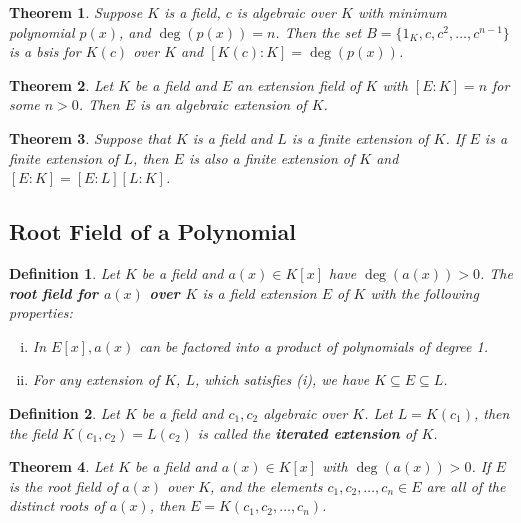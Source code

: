 \documentclass[letterpaper, 12pt]{article}
\newtheorem{defn}{Definition}
\newtheorem{thm}{Theorem}
\begin{document}
			\begin{thm}
			Suppose $K$ is a field, $c$ is algebraic over $K$ with minimum polynomial $p(x)$, and $\deg(p(x)) = n$.
			Then the set $B = \{ 1_{K}, c, c^{2}, \dots, c^{n-1} \}$ is a bsis for $K(c)$ over $K$ and $[K(c):K]=\deg(p(x))$.
			\end{thm}

			\begin{thm}
			Let $K$ be a field and $E$ an extension field of $K$ with $[E:K] = n$ for some $n>0$.
			Then $E$ is an algebraic extension of $K$.
			\end{thm}

			\begin{thm}
			Suppose that $K$ is a field and $L$ is a finite extension of $K$.
			If $E$ is a finite extension of $L$, then $E$ is also a finite extension of $K$ and $[E:K] = [E:L][L:K]$.
			\end{thm}

		\subsection{Root Field of a Polynomial}
		\label{sec:root_field_of_a_polynomial}
			\setcounter{defn}{22}
			\begin{defn}
			Let $K$ be a field and $a(x) \in K[x]$ have $\deg(a(x)) > 0$.
			The \textbf{root field for $a(x)$ over $K$} is a field extension $E$ of $K$ with the following properties:
				\begin{enumerate}[(i)]
				\item In $E[x], a(x)$ can be factored into a product of polynomials of degree 1.
				\item For any extension of $K$, $L$, which satisfies (i), we have $K \subseteq E \subseteq L$.
				\end{enumerate}
			\end{defn}

			\setcounter{defn}{24}
			\begin{defn}
			Let $K$ be a field and $c_{1}, c_{2}$ algebraic over $K$.
			Let $L = K(c_{1})$, then the field $K(c_{1},c_{2}) = L(c_{2})$ is called the \textbf{iterated extension} of $K$.
			\end{defn}

			\setcounter{thm}{25}
			\begin{thm}
			Let $K$ be a field and $a(x) \in K[x]$ with $\deg(a(x)) > 0$.
			If $E$ is the root field of $a(x)$ over $K$, and the elements $c_{1}, c_{2}, \dots, c_{n} \in E$ are all of the distinct roots of $a(x)$, then $E = K(c_{1}, c_{2}, \dots, c_{n})$.
			\end{thm}
\end{document}
